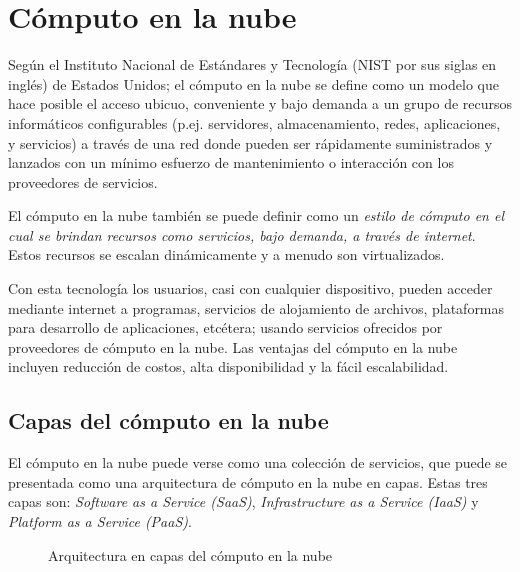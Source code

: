 \section{Cómputo en la nube}
\label{\detokenize{chapter_one/cloud_computing:computo-en-la-nube}}\label{\detokenize{chapter_one/cloud_computing::doc}}

\begin{remark}
Según el Instituto Nacional de Estándares y Tecnología (NIST por sus siglas en inglés) de Estados Unidos;
el cómputo en la
nube se define como un modelo que hace posible el acceso ubicuo, conveniente
y bajo demanda a un grupo de recursos informáticos configurables
(p.ej. servidores, almacenamiento, redes, aplicaciones, y servicios) a través
de una red donde pueden ser rápidamente suministrados y
lanzados con un mínimo esfuerzo de mantenimiento
o interacción con los proveedores de servicios.
\end{remark}


El cómputo en la nube también se puede definir como un \textit{estilo de cómputo en el cual
se brindan recursos como servicios, bajo demanda, a través de internet}.
Estos recursos se escalan dinámicamente y a menudo son virtualizados.

Con esta tecnología los usuarios, casi con cualquier dispositivo, pueden acceder mediante internet
a programas, servicios de alojamiento de archivos, plataformas para desarrollo de
aplicaciones, etcétera; usando servicios ofrecidos por
proveedores de cómputo en la nube. Las ventajas del cómputo en la nube incluyen
reducción de costos, alta disponibilidad y la fácil escalabilidad.


\subsection{Capas del cómputo en la nube}
\label{\detokenize{chapter_one/cloud_computing:capas-del-computo-en-la-nube}}
El cómputo en la nube puede verse como una colección de servicios, que puede se
presentada como una arquitectura de cómputo en la nube en capas. Estas
tres capas son: \textit{Software as a Service (SaaS)},
\textit{Infrastructure as a Service (IaaS)} y \textit{Platform as a Service (PaaS)}.

\begin{figure}[ht]
\centering
\capstart

\noindent{}
\caption{Arquitectura en capas del cómputo en la nube}\label{\detokenize{chapter_one/cloud_computing:c-c-layers}}\end{figure}



